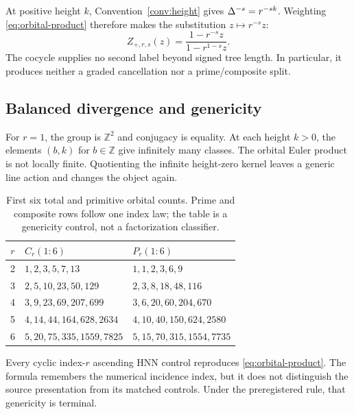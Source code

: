 At positive height $k$, Convention~\ref{conv:height} gives
$\Delta^{-s}=r^{-sk}$.  Weighting \eqref{eq:orbital-product} therefore makes
the substitution $z\mapsto r^{-s}z$:
\begin{equation}
  Z_{+,r,s}(z)
  =\frac{1-r^{-s}z}{1-r^{1-s}z}.
  \label{eq:modular-product}
\end{equation}
The cocycle supplies no second label beyond signed tree length.  In
particular, it produces neither a graded cancellation nor a prime/composite
split.

\subsection{Balanced divergence and genericity}

For $r=1$, the group is $\mathbb Z^2$ and conjugacy is equality.  At each
height $k>0$, the elements $(b,k)$ for $b\in\mathbb Z$ give infinitely many
classes.  The orbital Euler product is not locally finite.  Quotienting the
infinite height-zero kernel leaves a generic line action and changes the
object again.

\begin{table}[t]
\centering
\small
\caption{First six total and primitive orbital counts.  Prime and composite
rows follow one index law; the table is a genericity control, not a
factorization classifier.}
\label{tab:necklace-counts}
\begin{tabular}{cll}
\toprule
$r$ & $C_r(1{:}6)$ & $P_r(1{:}6)$ \\
\midrule
2 & $1,2,3,5,7,13$ & $1,1,2,3,6,9$ \\
3 & $2,5,10,23,50,129$ & $2,3,8,18,48,116$ \\
4 & $3,9,23,69,207,699$ & $3,6,20,60,204,670$ \\
5 & $4,14,44,164,628,2634$ & $4,10,40,150,624,2580$ \\
6 & $5,20,75,335,1559,7825$ & $5,15,70,315,1554,7735$ \\
\bottomrule
\end{tabular}
\end{table}

Every cyclic index-$r$ ascending HNN control reproduces
\eqref{eq:orbital-product}.  The formula remembers the numerical incidence
index, but it does not distinguish the source presentation from its matched
controls.  Under the preregistered rule, that genericity is terminal.
